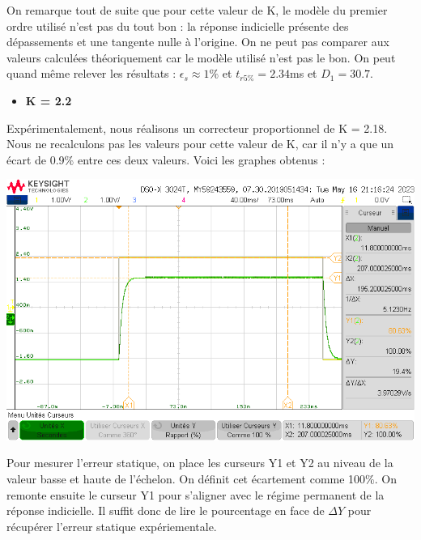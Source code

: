 \documentclass[12pt]{article}
\begin{document}
On remarque tout de suite que pour cette valeur de K, le modèle du premier ordre utilisé n'est pas du tout bon : la réponse indicielle présente des dépassements et une tangente nulle à l'origine. On ne peut pas comparer aux valeurs calculées théoriquement car le modèle utilisé n'est pas le bon.
On peut quand même relever les résultats : $\epsilon_s \approx 1\%$ et $t_{r5\%} = 2.34$ms et $D_1 = 30.7$. 
\newpage
\begin{itemize}
\item \bf \large K = 2.2
\end{itemize}
Expérimentalement, nous réalisons un correcteur proportionnel de K = 2.18. Nous ne recalculons pas les valeurs pour cette valeur de K, car il n'y a que un écart de 0.9$\%$ entre ces deux valeurs. Voici les graphes obtenus : 
\begin{center}
    \includegraphics[width = 18 cm]{TP3/Syst_1/P/estat-syst1-k2.2.png}
\end{center}
Pour mesurer l'erreur statique, on place les curseurs Y1 et Y2 au niveau de la valeur basse et haute de l'échelon. On définit cet écartement comme 100$\%$. On remonte ensuite le curseur Y1 pour s'aligner avec le régime permanent de la réponse indicielle. Il suffit donc de lire le pourcentage en face de $\Delta Y$ pour récupérer l'erreur statique expériementale.
\end{document}
